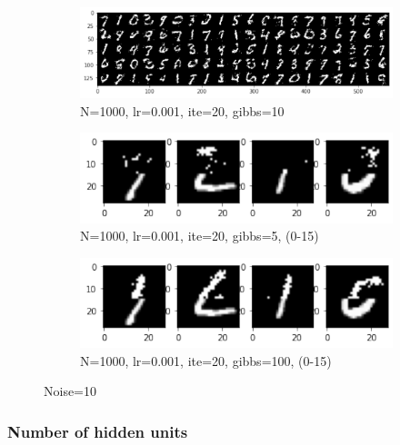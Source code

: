 \documentclass{article}
\begin{document}
\begin{figure}[h!]
     \centering
     \begin{subfigure}[b]{0.3\textwidth}
         \centering
         \includegraphics[width=\textwidth]{lab4/1000_0.001_20_10.pdf}
         \caption{N=1000, lr=0.001, ite=20, gibbs=10}
         \label{fig:noise5ite10}
     \end{subfigure}
     \hfill
     \begin{subfigure}[b]{0.3\textwidth}
         \centering
         \includegraphics[width=\textwidth]{lab4/1000_0.001_20_5_0-15.pdf}
         \caption{N=1000, lr=0.001, ite=20, gibbs=5, (0-15)}
         \label{fig:noise5ite100}
     \end{subfigure}
     \hfill
     \begin{subfigure}[b]{0.3\textwidth}
         \centering
         \includegraphics[width=\textwidth]{lab4/1000_0.001_20_100_0-15.pdf}
         \caption{N=1000, lr=0.001, ite=20, gibbs=100, (0-15)}
         \label{fig:noise5ite500}
     \end{subfigure}
        \caption{Noise=10}
        \label{fig:hopnoise10}
\end{figure}

\subsubsection{Number of hidden units}
\end{document}
